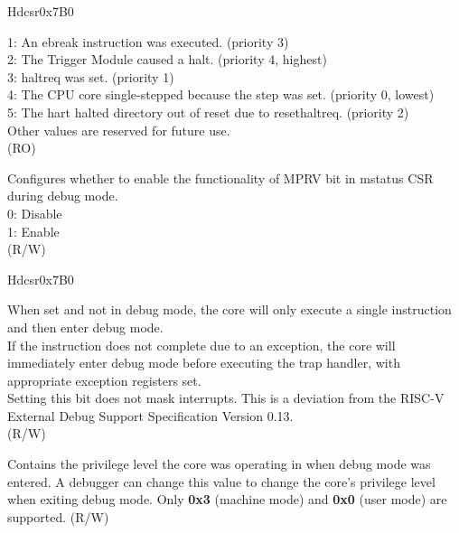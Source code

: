 \begin{register}{H}{dcsr}{0x7B0}
\begin{regdesc}
\begin{reglist}
1: An ebreak instruction was executed. (priority 3)\\
2: The Trigger Module caused a halt. (priority 4, highest)\\
3: haltreq was set. (priority 1)\\
4: The CPU core single-stepped because the step was set. (priority 0, lowest)\\
5: The hart halted directory out of reset due to resethaltreq. (priority 2)\\
Other values are reserved for future use.\\
(RO)
\label{fielddesc:DCSRMPRVEN}\item [mprven] Configures whether to enable the functionality of MPRV bit in mstatus CSR during debug mode.\\
0: Disable\\
1: Enable\\
(R/W)\\
\item [Continued on the next page...]
\end{reglist}\end{regdesc}
\end{register}
\addtocounter{Regfloat}{-1}
\begin{register}{H}{dcsr}{0x7B0}
\begin{regdesc}\begin{reglist}
\item [Continued from the previous page...]

\label{fielddesc:DCSRSTEP}\item [step] When set and not in debug mode, the core will only execute a single instruction and then enter debug mode. \\
If the instruction does not complete due to an exception, the core will immediately enter debug mode before executing the trap handler, with appropriate exception registers set.\\
Setting this bit does not mask interrupts. This is a deviation from the RISC-V External Debug Support Specification Version 0.13.\\
(R/W)\\
\label{fielddesc:DCSRPRV}\item [prv] Contains the privilege level the core was operating in when debug mode was entered. A debugger can change this value to change the core's privilege level when exiting debug mode. Only \textbf{0x3} (machine mode) and \textbf{0x0} (user mode) are supported. (R/W)
\end{reglist}
\end{regdesc}
\end{register}

